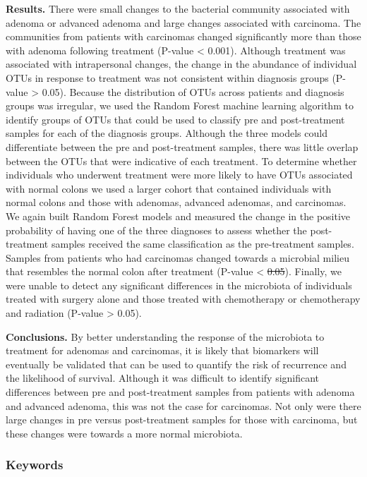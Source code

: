 \documentclass[12pt,]{article}
\providecommand{\DIFaddtex}[1]{{\protect\color{blue}\uwave{#1}}} %
\providecommand{\DIFdeltex}[1]{{\protect\color{red}\sout{#1}}}                      %
\providecommand{\DIFaddbegin}{} %
\providecommand{\DIFaddend}{} %
\providecommand{\DIFdelbegin}{} %
\providecommand{\DIFdelend}{} %
\providecommand{\DIFadd}[1]{\texorpdfstring{\DIFaddtex{#1}}{#1}} %
\providecommand{\DIFdel}[1]{\texorpdfstring{\DIFdeltex{#1}}{}} %
\begin{document}
\textbf{Results.} There were small changes to the bacterial community
associated with adenoma or advanced adenoma and large changes associated
with carcinoma. The communities from patients with carcinomas changed
significantly more than those with adenoma following treatment (P-value
\textless{} 0.001). Although treatment was associated with intrapersonal
changes, the change in the abundance of individual OTUs in response to
treatment was not consistent within diagnosis groups (P-value
\textgreater{} 0.05). Because the distribution of OTUs across patients
and diagnosis groups was irregular, we used the Random Forest machine
learning algorithm to identify groups of OTUs that could be used to
classify pre and post-treatment samples for each of the diagnosis
groups. Although the three models could differentiate between the pre
and post-treatment samples, there was little overlap between the OTUs
that were indicative of each treatment. To determine whether individuals
who underwent treatment were more likely to have OTUs associated with
normal colons we used a larger cohort that contained individuals with
normal colons and those with adenomas, advanced adenomas, and
carcinomas. We again built Random Forest models and measured the change
in the positive probability of having one of the three diagnoses to
assess whether the post-treatment samples received the same
classification as the pre-treatment samples. Samples from patients who
had carcinomas changed towards a microbial milieu that resembles the
normal colon after treatment (P-value \textless{} \DIFdelbegin \DIFdel{0.05}\DIFdelend \DIFaddbegin \DIFadd{0.001}\DIFaddend ). Finally, we
were unable to detect any significant differences in the microbiota of
individuals treated with surgery alone and those treated with
chemotherapy or chemotherapy and radiation (P-value \textgreater{}
0.05).

\textbf{Conclusions.} By better understanding the response of the
microbiota to treatment for adenomas and carcinomas, it is likely that
biomarkers will eventually be validated that can be used to quantify the
risk of recurrence and the likelihood of survival. Although it was
difficult to identify significant differences between pre and
post-treatment samples from patients with adenoma and advanced adenoma,
this was not the case for carcinomas. Not only were there large changes
in pre versus post-treatment samples for those with carcinoma, but these
changes were towards a more normal microbiota.

\subsubsection{Keywords}\label{keywords}
\end{document}
